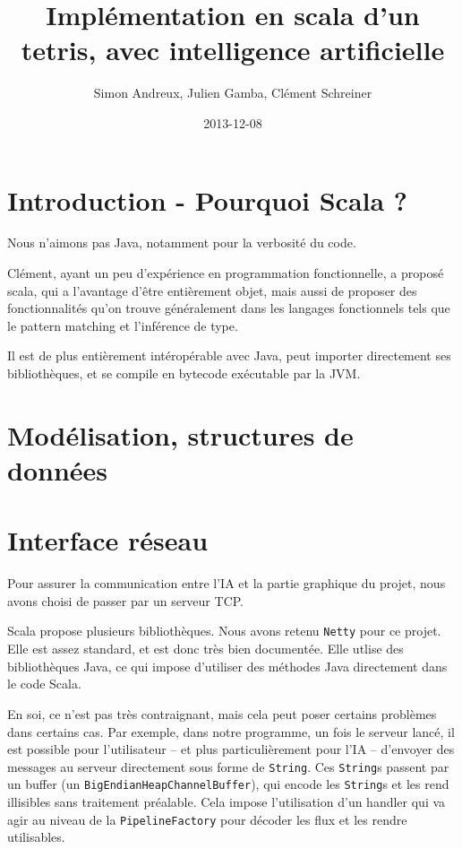 \documentclass[11pt]{article}
\author{Simon Andreux, Julien Gamba, Clément Schreiner}
\date{2013-12-08}
\title{Implémentation en scala d'un tetris, avec intelligence artificielle}
\begin{document}
\maketitle
\tableofcontents



\section{Introduction - Pourquoi Scala ?}
\label{sec-1}

Nous n'aimons pas Java, notamment pour la verbosité du code.

Clément, ayant un peu d'expérience en programmation fonctionnelle, a
proposé scala, qui a l'avantage d'être entièrement objet, mais aussi
de proposer des fonctionnalités qu'on trouve généralement dans les
langages fonctionnels tels que le pattern matching et l'inférence de
type.

Il est de plus entièrement intéropérable avec Java, peut importer directement ses bibliothèques, et se compile en bytecode exécutable par la JVM.
\section{Modélisation, structures de données}
\label{sec-2}

\section{Interface réseau}
\label{sec-3}
Pour assurer la communication entre l'IA et la partie graphique du
projet, nous avons choisi de passer par un serveur TCP.

Scala propose plusieurs bibliothèques. Nous avons retenu \texttt{Netty}
pour ce projet. Elle est assez standard, et est donc très bien documentée.
Elle utlise des bibliothèques Java, ce qui impose d'utiliser des
méthodes Java directement dans le code Scala.

En soi, ce n'est pas très contraignant, mais cela peut poser certains
problèmes dans certains cas. Par exemple, dans notre programme, un fois
le serveur lancé, il est possible pour l'utilisateur -- et plus
particulièrement pour l'IA -- d'envoyer des messages au serveur
directement sous forme de \texttt{String}. Ces \texttt{String}s 
passent par un buffer (un \texttt{BigEndianHeapChannelBuffer}), 
qui encode les \texttt{String}s et les rend illisibles sans 
traitement préalable. Cela impose l'utilisation d'un handler qui va agir au
niveau de la \texttt{PipelineFactory} pour décoder les flux et les rendre 
utilisables.
\end{document}
